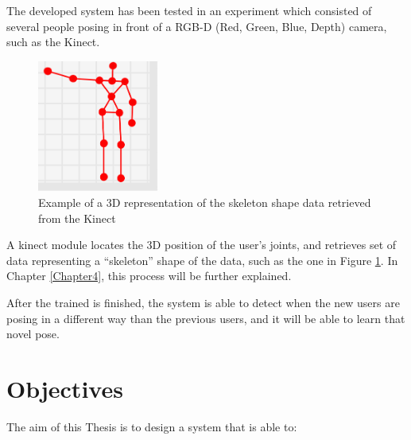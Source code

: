 The developed system has been tested in an experiment which consisted of several people posing in front of a RGB-D (Red, Green, Blue, Depth) camera, such as the Kinect.
\begin{figure}[h]
\includegraphics[width=4cm]{Figures/Example1}
\centering
\caption{Example of a 3D representation of the skeleton shape data retrieved from the Kinect \label{fig:ske}}
\end{figure}


A kinect module locates the 3D position of the user's joints, and retrieves set of data representing a “skeleton” shape of the data, such as the one in Figure \ref{fig:ske}. In Chapter \ref{Chapter4}, this process will be further explained.

After the trained is finished, the system is able to detect when the new users are posing in a different way than the previous users, and it will be able to learn that novel pose.

\section{Objectives}

The aim of this Thesis is to design a system that is able to:


